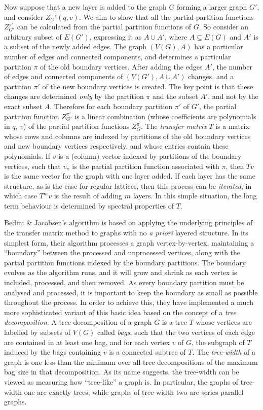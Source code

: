 Now suppose that a new layer is added to the graph $G$ forming a larger graph $G'$, and consider $Z_G'(q,v)$. We aim to show that all the partial partition functions $Z_{G'}^{\pi'}$ can be calculated from the partial partition functions of $G$.  So consider an arbitrary  subset of $E(G')$, expressing it as $A \cup A'$, where $A \subseteq E(G)$ and $A'$ is a subset of the newly added edges. The graph $(V(G),A)$ has a particular number of edges and connected components, and determines a particular partition $\pi$ of the old boundary vertices. After adding the edges $A'$, the number of edges and connected components of $(V(G'),A \cup A')$ changes, and a partition $\pi'$ of the new boundary vertices is created. The key point is that these changes are determined {\em only} by the partition $\pi$ and the subset $A'$, and not by the exact subset $A$. Therefore for each boundary partition $\pi'$ of $G'$, the partial partition function $Z_{G'}^{\pi'}$ is a linear combination (whose coefficients are polynomials in $q$, $v$) of the partial partition functions $Z_G^\pi$.  
The {\em transfer matrix} $T$ is a matrix whose rows and columns are indexed by partitions of the old boundary vertices and new boundary vertices respectively, and whose entries contain these polynomials. If $v$ is a (column) vector indexed by partitions of the boundary vertices, such that $v_\pi$ is the partial partition function associated with $\pi$, then $Tv$ is the same vector for the graph with one layer added. If each layer has the same structure, as is the case for regular lattices, then this process can be {\em iterated}, in which case $T^mv$ is the result of adding $m$ layers. In this simple situation, the long term behaviour is determined by spectral properties of $T$.

Bedini \& Jacobsen's algorithm is based on applying the underlying principles of the transfer matrix method to graphs with no {\em a priori} layered structure. In its simplest form, their algorithm processes a graph vertex-by-vertex, maintaining a ``boundary'' between the processed and unprocessed vertices, along with the partial partition functions indexed by the boundary partitions. The boundary evolves as the algorithm runs, and it will grow and shrink as each vertex is included, processed, and then removed.  As every boundary partition must be analysed and processed, it is important to keep the boundary as small as possible throughout the process. In order to achieve this, they have implemented a much more sophisticated variant of this basic idea based on the concept of a {\em tree decomposition}. A tree decomposition of a graph $G$ is a tree $T$ whose vertices are labelled by subsets of $V(G)$ called {\em bags}, such that the two vertices of each edge are contained in at least one bag, and for each vertex $v$ of $G$, the subgraph of $T$ induced by the bags containing $v$ is a connected subtree of $T$. The {\em tree-width} of a graph is one less than the minimum over all tree decompositions of the maximum bag size in that decomposition. As its name suggests, the tree-width can be viewed as measuring how ``tree-like'' a graph is. In particular, the graphs of tree-width one are exactly trees, while graphs of tree-width two are series-parallel graphs. 

